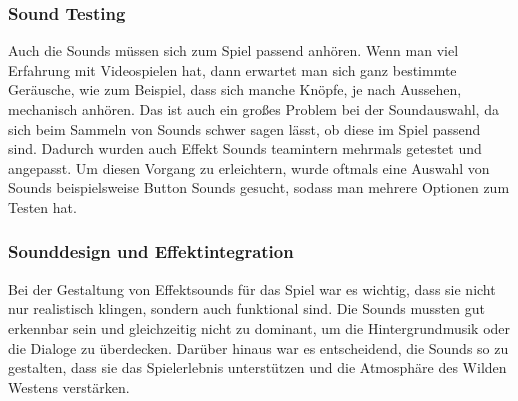 \subsubsection{Sound Testing}\label{subsubsec:Sound-Testing}
Auch die Sounds müssen sich zum Spiel passend anhören.
Wenn man viel Erfahrung mit Videospielen hat, dann erwartet man sich ganz bestimmte Geräusche, wie zum Beispiel, dass sich manche Knöpfe, je nach Aussehen, mechanisch anhören.
Das ist auch ein großes Problem bei der Soundauswahl, da sich beim Sammeln von Sounds schwer sagen lässt, ob diese im Spiel passend sind.
Dadurch wurden auch Effekt Sounds teamintern mehrmals getestet und angepasst.
Um diesen Vorgang zu erleichtern, wurde oftmals eine Auswahl von Sounds beispielsweise Button Sounds gesucht, sodass man mehrere Optionen zum Testen hat.

\subsubsection{Sounddesign und Effektintegration}\label{subsubsec:Sounddesign}
Bei der Gestaltung von Effektsounds für das Spiel war es wichtig, dass sie nicht nur realistisch klingen, sondern auch funktional sind.
Die Sounds mussten gut erkennbar sein und gleichzeitig nicht zu dominant, um die Hintergrundmusik oder die Dialoge zu überdecken.
Darüber hinaus war es entscheidend, die Sounds so zu gestalten, dass sie das Spielerlebnis unterstützen und die Atmosphäre des Wilden Westens verstärken.
%

\renewcommand{\kapitelautor}{}
